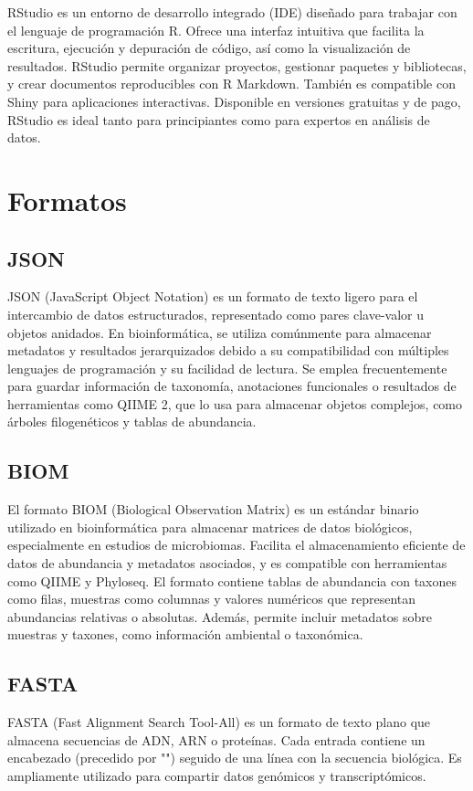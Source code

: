 RStudio es un entorno de desarrollo integrado (IDE) diseñado para trabajar con el lenguaje de programación R. Ofrece una interfaz intuitiva que facilita la escritura, ejecución y depuración de código, así como la visualización de resultados. RStudio permite organizar proyectos, gestionar paquetes y bibliotecas, y crear documentos reproducibles con R Markdown. También es compatible con Shiny para aplicaciones interactivas. Disponible en versiones gratuitas y de pago, RStudio es ideal tanto para principiantes como para expertos en análisis de datos.\\

\section{Formatos}

\subsection{JSON}
JSON (JavaScript Object Notation) es un formato de texto ligero para el intercambio de datos estructurados, representado como pares clave-valor u objetos anidados. En bioinformática, se utiliza comúnmente para almacenar metadatos y resultados jerarquizados debido a su compatibilidad con múltiples lenguajes de programación y su facilidad de lectura. Se emplea frecuentemente para guardar información de taxonomía, anotaciones funcionales o resultados de herramientas como QIIME 2, que lo usa para almacenar objetos complejos, como árboles filogenéticos y tablas de abundancia.\\

\subsection{BIOM}
El formato BIOM (Biological Observation Matrix) es un estándar binario utilizado en bioinformática para almacenar matrices de datos biológicos, especialmente en estudios de microbiomas. Facilita el almacenamiento eficiente de datos de abundancia y metadatos asociados, y es compatible con herramientas como QIIME y Phyloseq. El formato contiene tablas de abundancia con taxones como filas, muestras como columnas y valores numéricos que representan abundancias relativas o absolutas. Además, permite incluir metadatos sobre muestras y taxones, como información ambiental o taxonómica.\\

\subsection{FASTA}
FASTA (Fast Alignment Search Tool-All) es un formato de texto plano que almacena secuencias de ADN, ARN o proteínas. Cada entrada contiene un encabezado (precedido por "\>") seguido de una línea con la secuencia biológica. Es ampliamente utilizado para compartir datos genómicos y transcriptómicos.\\

